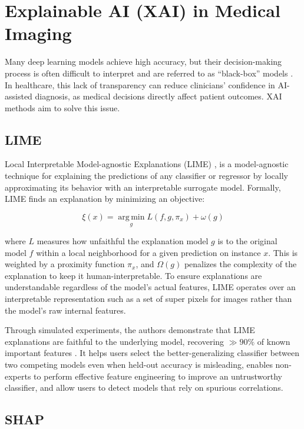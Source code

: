 \section{Explainable AI (XAI) in Medical Imaging}

Many deep learning models achieve high accuracy, but their decision-making process is often difficult to interpret and are
referred to as ``black-box'' models \cite{tjoa2021survey}. In healthcare, this lack of transparency can reduce clinicians'
confidence in AI-assisted diagnosis, as medical decisions directly affect patient
outcomes. XAI methods aim to solve this issue.

\subsection{LIME}

Local Interpretable Model-agnostic Explanations (LIME) \cite{ribeiro2016should}, is a model-agnostic
technique for explaining the predictions of any classifier or regressor by locally approximating its behavior with an interpretable
surrogate model. Formally, LIME finds an explanation by minimizing an objective:

\begin{equation}[LIME Explanation Objective]
\xi(x) = \operatorname*{arg\,min}_g L(f, g, \pi_x) + \omega(g)
\end{equation}

where $L$ measures how unfaithful the explanation model $g$ is to the original model $f$ within a local neighborhood for a given
prediction on instance $x$. This is weighted by a proximity function $\pi_x$, and
$\Omega(g)$ penalizes the complexity of the explanation to keep it human-interpretable. To ensure explanations are understandable
regardless of the model's actual features, LIME operates over an interpretable representation such as a set of super pixels for
images rather than the model's raw internal features.

Through simulated experiments, the authors demonstrate that LIME explanations are faithful to the underlying model,
recovering $\gg90\%$ of known important features \cite{ribeiro2016should}. It helps users select the
better-generalizing classifier between two competing models even when held-out accuracy is misleading, enables non-experts to
perform effective feature engineering to improve an untrustworthy classifier, and allow users to detect models that rely on
spurious correlations.

\subsection{SHAP}


